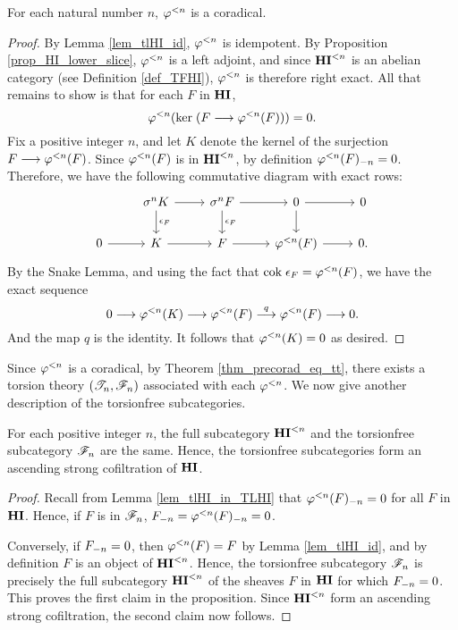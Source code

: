 \begin{prop}\label{prop_tlHIn_corad}
For each natural number $n$, $\tlHI{n}$ is a coradical.
\end{prop}
\begin{proof}
By Lemma \ref{lem_tlHI_id}, $\tlHI{n}$ is idempotent. 
By Proposition \ref{prop_HI_lower_slice}, $\tlHI{n}$ is a left 
adjoint, and since $\TFHI{n}$ is an abelian category (see 
Definition \ref{def_TFHI}), $\tlHI{n}$ is therefore right exact. 
All that remains to show is that for each $F$ in $\HI$,
\[
\tlHI{n}(\ker (F \to \tlHI{n}(F))) = 0.
\]
Fix a positive integer $n$, and let $K$ denote the kernel of the 
surjection $F \to \tlHI{n}(F)$. Since $\tlHI{n}(F)$ is in 
$\TLHI{n}{\HI}$, by definition $\RHI[n]{\tlHI{n}(F)} = 0$. 
Therefore, we have the following commutative diagram with exact
rows:
\[
\begin{tikzcd}
{} &\sgHI{n} K \arrow{d}{\cuHI_F} \arrow{r}
   &\sgHI{n} F \arrow{d}{\cuHI_F} \arrow{r}
   &0 \arrow{d} \arrow{r}
   &0 \\
0 \arrow{r} &
  K \arrow{r}&
  F \arrow{r}&
  \tlHI{n}(F) \arrow{r}&
  0.
\end{tikzcd}
\]
By the Snake Lemma, and using the fact that $\cok \cuHI_F = 
\tlHI{n}(F)$, we have the exact sequence
\[
0 \to \tlHI{n}(K) \to \tlHI{n}(F) \stackrel{q}{\to} \tlHI{n}(F) 
   \to 0.
\]
And the map $q$ is the identity. It follows that $\tlHI{n}(K) = 0$ 
as desired.
\end{proof}

Since $\tlHI{n}$ is a coradical, by Theorem \ref{thm_precorad_eq_tt},
there exists a torsion theory $(\Cat{T}_n, \Cat{F}_n)$ associated with
each $\tlHI{n}$. We now give another description of the torsionfree
subcategories.

\begin{prop}\label{prop_tsubcat_eq_tlHI}
For each positive integer $n$, the full subcategory $\TFHI{n}$ and
the torsionfree subcategory $\Cat{F}_n$ are the same. Hence, the
torsionfree subcategories form an ascending strong cofiltration of
$\HI$.
\end{prop}
\begin{proof}
Recall from Lemma \ref{lem_tlHI_in_TLHI} that 
$\RHI[n]{\tlHI{n}(F)} = 0$ for all $F$ in $\HI$. Hence, if $F$ is 
in $\Cat{F}_n$, $\RHI[n]{F} = \RHI[n]{\tlHI{n}(F)} = 0$.

Conversely, if $\RHI[n]{F} = 0$, then $\tlHI{n}(F) = F$ by Lemma
\ref{lem_tlHI_id}, and by definition $F$ is an object of 
$\TFHI{n}$. Hence, the torsionfree subcategory $\Cat{F}_n$ is 
precisely the full subcategory $\TFHI{n}$ of the sheaves $F$ in 
$\HI$ for which $\RHI[n]{F} = 0$. This proves the first claim
in the proposition. Since $\TFHI{n}$ form an ascending strong 
cofiltration, the second claim now follows.
\end{proof}

